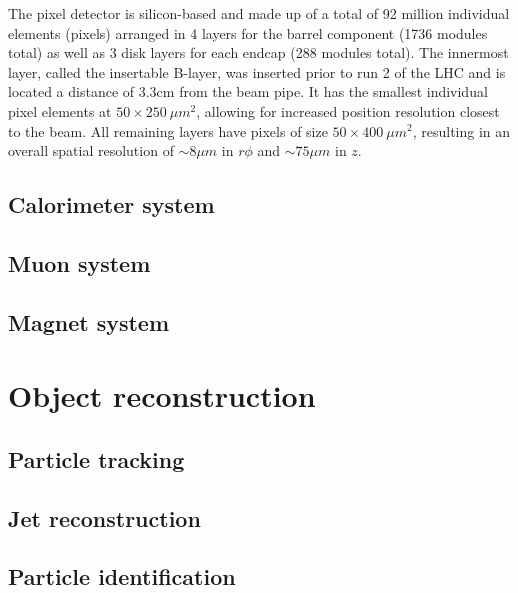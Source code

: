 The pixel detector \cite{pernegger-pixel-detector} is silicon-based and made up of a total of 92 million individual 
elements (pixels) arranged in 4 layers for the barrel component (1736 modules total) as well as 3 disk layers for each 
endcap (288 modules total). The innermost layer, called the insertable B-layer, was inserted prior to run 2 of the LHC 
and is located a distance of 3.3cm from the beam pipe. It has the smallest individual pixel elements at 
$50\times250\ \mu m^2$, allowing for increased position resolution closest to the beam. All remaining layers have 
pixels of size $50\times400\ \mu m^2$, resulting in an overall spatial resolution of $\sim 8 \mu m$ in $r\phi$ and 
$\sim 75 \mu m$ in $z$. \par



\subsection{Calorimeter system}

\subsection{Muon system}

\subsection{Magnet system}

\section{Object reconstruction}

\subsection{Particle tracking}

\subsection{Jet reconstruction}

\subsection{Particle identification}